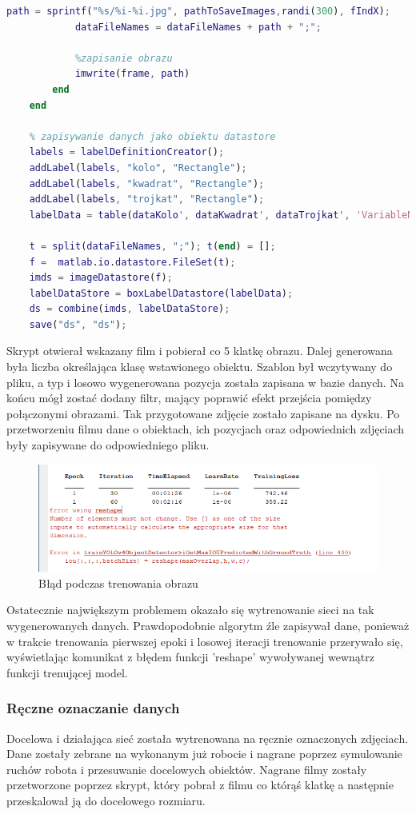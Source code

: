 \begin{lstlisting}[language=Matlab,caption=Generowanie danych]
			path = sprintf("%s/%i-%i.jpg", pathToSaveImages,randi(300), fIndX);
			dataFileNames = dataFileNames + path + ";";

			%zapisanie obrazu
			imwrite(frame, path)
		end
	end
	
	% zapisywanie danych jako obiektu datastore
	labels = labelDefinitionCreator();
	addLabel(labels, "kolo", "Rectangle");
	addLabel(labels, "kwadrat", "Rectangle");
	addLabel(labels, "trojkat", "Rectangle");
	labelData = table(dataKolo', dataKwadrat', dataTrojkat', 'VariableNames',{'kolo', 'kwadrat', 'trojkat'});
	
	t = split(dataFileNames, ";"); t(end) = [];
	f =  matlab.io.datastore.FileSet(t);
	imds = imageDatastore(f);
	labelDataStore = boxLabelDatastore(labelData);
	ds = combine(imds, labelDataStore);
	save("ds", "ds");
\end{lstlisting}
Skrypt otwierał wskazany film i pobierał co 5 klatkę obrazu. Dalej generowana była liczba określająca klasę wstawionego obiektu.
Szablon był wczytywany do pliku, a typ i losowo wygenerowana pozycja została zapisana w bazie danych.
Na końcu mógł zostać dodany filtr, mający poprawić efekt przejścia pomiędzy połączonymi obrazami. 
Tak przygotowane zdjęcie zostało zapisane na dysku. 
Po przetworzeniu filmu dane o obiektach, ich pozycjach oraz odpowiednich zdjęciach były zapisywane do odpowiedniego pliku.
\begin{figure}[H]
	\centering
	\includegraphics[width=12cm]{pages/uczenie/img/errorPrzyTrenowaniu.png}
	\caption{Błąd podczas trenowania obrazu}
\end{figure}
Ostatecznie największym problemem okazało się wytrenowanie sieci na tak wygenerowanych danych.
Prawdopodobnie algorytm źle zapisywał dane, ponieważ w trakcie trenowania pierwszej epoki i losowej iteracji trenowanie przerywało się,
wyświetlając komunikat z błędem funkcji 'reshape' wywoływanej wewnątrz funkcji trenującej model.

\subsubsection{Ręczne oznaczanie danych}
Docelowa i działająca sieć została wytrenowana na ręcznie oznaczonych zdjęciach. 
Dane zostały zebrane na wykonanym już robocie i nagrane poprzez symulowanie ruchów robota i przesuwanie docelowych obiektów.
Nagrane filmy zostały przetworzone poprzez skrypt, który pobrał z filmu co którąś klatkę a następnie przeskalował ją do docelowego rozmiaru. 


